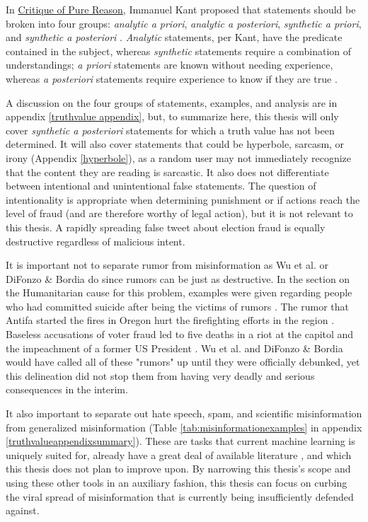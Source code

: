 \documentclass[12pt]{article}
\begin{document}
In \underline{Critique of Pure Reason}, Immanuel Kant proposed that statements should be broken into four groups: \textit{analytic a priori}, \textit{analytic a posteriori}, \textit{synthetic a priori}, and \textit{synthetic a posteriori} \cite{kant1908critique,frege1988collected,quine1951main}. \textit{Analytic} statements, per Kant, have the predicate contained in the subject, whereas \textit{synthetic} statements require a combination of understandings; \textit{a priori} statements are known without needing experience, whereas \textit{a posteriori} statements require experience to know if they are true \cite{wright1997companion}. 

A discussion on the four groups of statements, examples, and analysis are in appendix \ref{truthvalue appendix}, but, to summarize here, this thesis will only cover \textit{synthetic a posteriori} statements for which a truth value has not been determined. It will also cover statements that could be hyperbole, sarcasm, or irony (Appendix \ref{hyperbole}), as a random user may not immediately recognize that the content they are reading is sarcastic. It also does not differentiate between intentional and unintentional false statements. The question of intentionality is appropriate when determining punishment or if actions reach the level of fraud (and are therefore worthy of legal action), but it is not relevant to this thesis. A rapidly spreading false tweet about election fraud is equally destructive regardless of malicious intent.

It is important not to separate rumor from misinformation as Wu et al. or DiFonzo \& Bordia do since rumors can be just as destructive. In the section on the Humanitarian cause for this problem, examples were given regarding people who had committed suicide after being the victims of rumors \cite{starbird2014rumors,williamson2019alex}. The rumor that Antifa started the fires in Oregon hurt the firefighting efforts in the region  \cite{robinson2020oregon}. Baseless accusations of voter fraud led to five deaths in a riot at the capitol and the impeachment of a former US President \cite{fandos2021trump,Levenson2021capitol}.  Wu et al. and DiFonzo \& Bordia would have called all of these "rumors" up until they were officially debunked, yet this delineation did not stop them from having very deadly and serious consequences in the interim.

It also important to separate out hate speech, spam, and scientific misinformation from generalized misinformation (Table \ref{tab:misinformationexamples} in appendix \ref{truthvalueappendixsummary}). These are tasks that current machine learning is uniquely suited for, already have a great deal of available literature \cite{xu2019exploiting,wang2010detecting,ahmed2018detecting,al2019spam,oriola2020evaluating,gaydhani2018detecting,al2020lies,farrell2019evidence}, and which this thesis does not plan to improve upon. By narrowing this thesis's scope and using these other tools in an auxiliary fashion, this thesis can focus on curbing the viral spread of misinformation that is currently being insufficiently defended against. 
\end{document}
